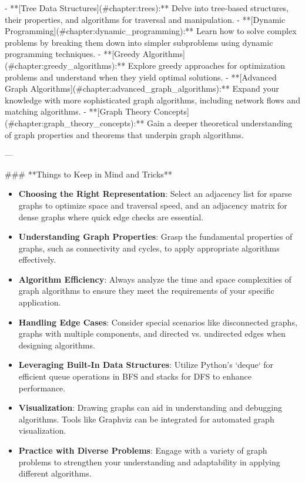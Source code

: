 - **[Tree Data Structures](#chapter:trees):** Delve into tree-based structures, their properties, and algorithms for traversal and manipulation.
- **[Dynamic Programming](#chapter:dynamic_programming):** Learn how to solve complex problems by breaking them down into simpler subproblems using dynamic programming techniques.
- **[Greedy Algorithms](#chapter:greedy_algorithms):** Explore greedy approaches for optimization problems and understand when they yield optimal solutions.
- **[Advanced Graph Algorithms](#chapter:advanced_graph_algorithms):** Expand your knowledge with more sophisticated graph algorithms, including network flows and matching algorithms.
- **[Graph Theory Concepts](#chapter:graph_theory_concepts):** Gain a deeper theoretical understanding of graph properties and theorems that underpin graph algorithms.

---
    
### **Things to Keep in Mind and Tricks**

\begin{itemize}
    \item \textbf{Choosing the Right Representation}: Select an adjacency list for sparse graphs to optimize space and traversal speed, and an adjacency matrix for dense graphs where quick edge checks are essential.
    \item \textbf{Understanding Graph Properties}: Grasp the fundamental properties of graphs, such as connectivity and cycles, to apply appropriate algorithms effectively.
    \item \textbf{Algorithm Efficiency}: Always analyze the time and space complexities of graph algorithms to ensure they meet the requirements of your specific application.
    \item \textbf{Handling Edge Cases}: Consider special scenarios like disconnected graphs, graphs with multiple components, and directed vs. undirected edges when designing algorithms.
    \item \textbf{Leveraging Built-In Data Structures}: Utilize Python's `deque` for efficient queue operations in BFS and stacks for DFS to enhance performance.
    \item \textbf{Visualization}: Drawing graphs can aid in understanding and debugging algorithms. Tools like Graphviz can be integrated for automated graph visualization.
    \item \textbf{Practice with Diverse Problems}: Engage with a variety of graph problems to strengthen your understanding and adaptability in applying different algorithms.
\end{itemize}

